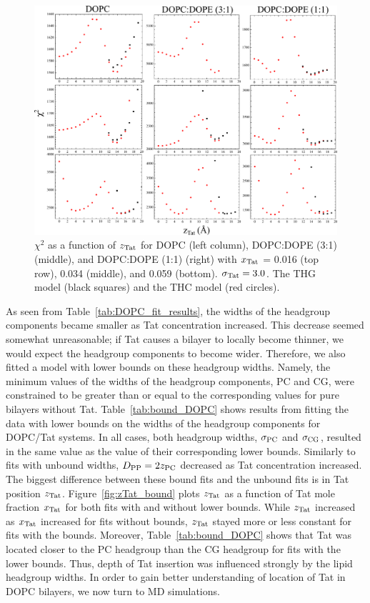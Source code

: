 \begin{figure}[htbp]
  \centering
  \includegraphics[width=\textwidth]{figures/Tat/SDP_Results/X2/X2}
  \caption[$\chi^2$ as a function of $\zTat$ for DOPC (left column), 
  DOPC:DOPE (3:1) (middle), and DOPC:DOPE (1:1) (right) 
  with $\xTat$ = 0.016 (top row), 0.034 (middle), and 0.059 (bottom)]
  {$\chi^2$ as a function of $\zTat$ for DOPC (left column), 
  DOPC:DOPE (3:1) (middle), and DOPC:DOPE (1:1) (right) 
  with $\xTat$ = 0.016 (top row), 0.034 (middle), and 0.059 (bottom). 
  $\sigma_\textrm{Tat} = 3.0$. The THG model (black squares) and the THC model (red circles).}
  \label{fig:DOPC_Tat_X2}
\end{figure}

As seen from Table~\ref{tab:DOPC_fit_results}, 
the widths of the headgroup components
became smaller as Tat concentration increased. This
decrease seemed somewhat unreasonable; if Tat causes a bilayer 
to locally become thinner, 
we would expect the headgroup components to become
wider. Therefore, we also fitted a model with lower bounds
on these headgroup widths. Namely, the minimum values of the widths of
the headgroup components, PC and CG, were constrained to be greater than
or equal to the corresponding values for pure bilayers without Tat. 
Table~\ref{tab:bound_DOPC} shows results from fitting the data with
lower bounds on the widths of the headgroup components for DOPC/Tat systems.
In all cases, both headgroup widths, $\sigma_\textrm{PC}$ and $\sigma_\textrm{CG}$, resulted 
in the same value as the value of their corresponding lower bounds. 
Similarly to fits with unbound widths, $D_\textrm{PP}=2z_\textrm{PC}$ decreased as Tat concentration
increased. The biggest difference between these bound fits and the unbound fits
is in Tat position $\zTat$. Figure~\ref{fig:zTat_bound} plots $\zTat$ as a function
of Tat mole fraction $\xTat$ for both fits with and without lower bounds.
While $\zTat$ increased as $\xTat$ increased for fits without bounds, $\zTat$
stayed more or less constant for fits with the bounds. Moreover, 
Table~\ref{tab:bound_DOPC} shows that 
Tat was located closer to the PC headgroup than the CG headgroup
for fits with the lower bounds. Thus,
depth of Tat insertion was influenced strongly by the lipid headgroup widths.
In order to gain better understanding of location of Tat in DOPC bilayers,
we now turn to MD simulations.

